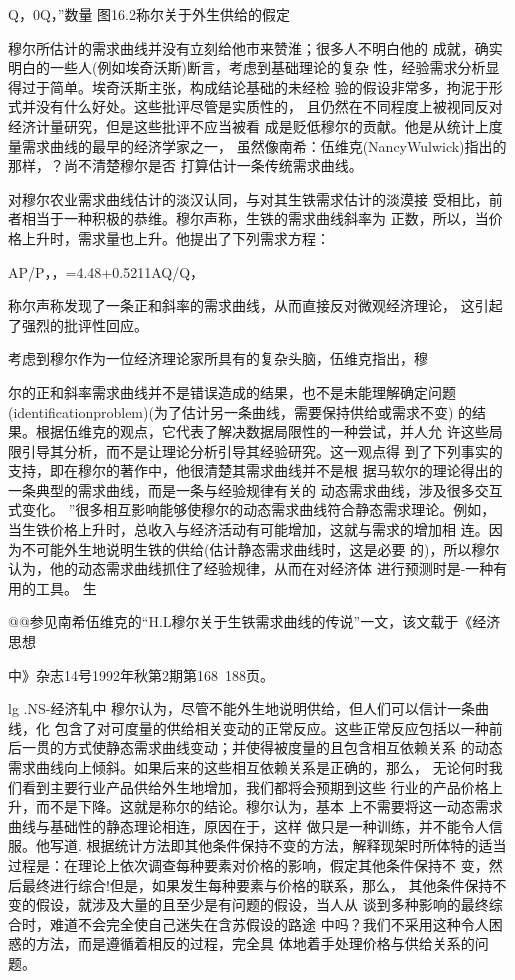 Q，0Q，”数量
图16.2称尔关于外生供给的假定



穆尔所估计的需求曲线并没有立刻给他市来赞淮；很多人不明白他的
成就，确实明白的一些人(例如埃奇沃斯)断言，考虑到基础理论的复杂
性，经验需求分析显得过于简单。埃奇沃斯主张，构成结论基础的未经检
验的假设非常多，拘泥于形式并没有什么好处。这些批评尽管是实质性的，
且仍然在不同程度上被视同反对经济计量研究，但是这些批评不应当被看
成是贬低穆尔的贡献。他是从统计上度量需求曲线的最早的经济学家之一，
虽然像南希：伍维克(NancyWulwick)指出的那样，？尚不清楚穆尔是否
打算估计一条传统需求曲线。

对穆尔农业需求曲线估计的淡汉认同，与对其生铁需求估计的淡漠接
受相比，前者相当于一种积极的恭维。穆尔声称，生铁的需求曲线斜率为
正数，所以，当价格上升时，需求量也上升。他提出了下列需求方程：

AP/P，，=4.48+0.5211AQ/Q，

称尔声称发现了一条正和斜率的需求曲线，从而直接反对微观经济理论，
这引起了强烈的批评性回应。

考虑到穆尔作为一位经济理论家所具有的复杂头脑，伍维克指出，穆

尔的正和斜率需求曲线并不是错误造成的结果，也不是未能理解确定问题
(identificationproblem)(为了估计另一条曲线，需要保持供给或需求不变)
的结果。根据伍维克的观点，它代表了解决数据局限性的一种尝试，并人允
许这些局限引导其分析，而不是让理论分析引导其经验研究。这一观点得
到了下列事实的支持，即在穆尔的著作中，他很清楚其需求曲线并不是根
据马软尔的理论得出的一条典型的需求曲线，而是一条与经验规律有关的
动态需求曲线，涉及很多交互式变化。
”很多相互影响能够使穆尔的动态需求曲线符合静态需求理论。例如，
当生铁价格上升时，总收入与经济活动有可能增加，这就与需求的增加相
连。因为不可能外生地说明生铁的供给(估计静态需求曲线时，这是必要
的)，所以穆尔认为，他的动态需求曲线抓住了经验规律，从而在对经济体
进行预测时是-一种有用的工具。
生

@@参见南希伍维克的“H.L穆尔关于生铁需求曲线的传说”一文，该文载于《经济思想

中》杂志14号1992年秋第2期第168~188页。

lg
.NS-经济轧中
穆尔认为，尽管不能外生地说明供给，但人们可以信计一条曲线，化
包含了对可度量的供给相关变动的正常反应。这些正常反应包括以一种前
后一贯的方式使静态需求曲线变动；并使得被度量的且包含相互依赖关系
的动态需求曲线向上倾斜。如果后来的这些相互依赖关系是正确的，那么，
无论何时我们看到主要行业产品供给外生地增加，我们都将会预期到这些
行业的产品价格上升，而不是下降。这就是称尔的结论。穆尔认为，基本
上不需要将这一动态需求曲线与基础性的静态理论相连，原因在于，这样
做只是一种训练，并不能令人信服。他写道.
根据统计方法即其他条件保持不变的方法，解释现架时所体特的适当
过程是：在理论上依次调查每种要素对价格的影响，假定其他条件保持不
变，然后最终进行综合!但是，如果发生每种要素与价格的联系，那么，
其他条件保持不变的假设，就涉及大量的且至少是有问题的假设，当人从
谈到多种影响的最终综合时，难道不会完全使自己迷失在含苏假设的路途
中吗？我们不采用这种令人困惑的方法，而是遵循着相反的过程，完全具
体地着手处理价格与供给关系的问题。

